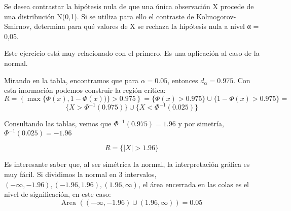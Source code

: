 \begin{problem}[2] Se desea contrastar la hipótesis nula de que una única observación X procede de una distribución N(0,1). Si se utiliza para ello el contraste de Kolmogorov-Smirnov, determina para qué valores de X se rechaza la hipótesis nula a nivel α = 0,05.
\solution

Este ejercicio está muy relacionado con el primero. Es una aplicación al caso de la normal.


Mirando en la tabla, encontramos que para $α = 0.05$, entonces $d_α = 0.975$. Con esta inormación podemos construir la región crítica:
\[ R = \left\{\max\{\Phi(x), 1 - \Phi(x))\} > 0.975\right\} = \{\Phi(x) > 0.975\} \cup \{1 - \Phi(x) > 0.975\} =\]
\[ \{ X>\Phi^{-1}(0.975)\} \cup \{X < \Phi^{-1}(0.025)\}\]

Consultando las tablas, vemos que $\Phi^{-1}(0.975) = 1.96$ y por simetría, $\Phi^{-1}(0.025) = -1.96$

\[R = \{|X| > 1.96\}\]


\obs Es interesante saber que, al ser simétrica la normal, la interpretación gráfica es muy fácil. Si dividimos la normal en 3 intervalos, $(-∞ , -1.96) , (-1.96,1.96) , (1.96, ∞)$, el área encerrada en las colas es el nivel de significación, en este caso: \[\text{Area }\left((-∞ , -1.96)\cup (1.96, ∞)\right) = 0.05\]

\end{problem}
